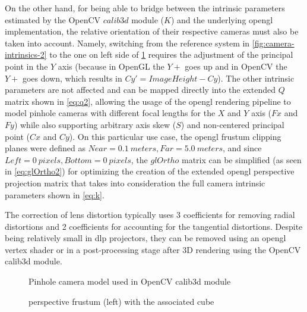 On the other hand, for being able to bridge between the intrinsic parameters estimated by the OpenCV $calib3d$ module ($K$) and the underlying \gls{opengl} implementation, the relative orientation of their respective cameras must also be taken into account. Namely, switching from the reference system in \cref{fig:camera-intrinsics-2} to the one on left side of \cref{fig:gl-projection-matrix} requires the adjustment of the principal point in the $Y$ axis (because in OpenGL the $Y+$ goes up and in OpenCV the $Y+$ goes down, which results in $Cy'=ImageHeight-Cy$). The other intrinsic parameters are not affected and can be mapped directly into the extended $Q$ matrix shown in \cref{eq:q2}, allowing the usage of the \gls{opengl} rendering pipeline to model pinhole cameras with different focal lengths for the $X$ and $Y$ axis ($Fx$ and $Fy$) while also supporting arbitrary axis skew ($S$) and non-centered principal point ($Cx$ and $Cy$). On this particular use case, the \gls{opengl} frustum clipping planes were defined as $Near=0.1\ meters, Far=5.0\ meters$, and since $Left=0\ pixels, Bottom=0\ pixels$, the $glOrtho$ matrix can be simplified (as seen in \cref{eq:glOrtho2}) for optimizing the creation of the extended \gls{opengl} perspective projection matrix that takes into consideration the full camera intrinsic parameters shown in \cref{eq:k}.

The correction of lens distortion typically uses 3 coefficients for removing radial distortions and 2 coefficients for accounting for the tangential distortions. Despite being relatively small in \gls{dlp} projectors, they can be removed using an \gls{opengl} vertex shader or in a post-processing stage after 3D rendering using the OpenCV calib3d module.

\begin{figure}[H]
	\begin{floatrow}[2]
		{\caption[Pinhole camera model used in the OpenCV calib3d module]{Pinhole camera model used in OpenCV calib3d module\footnotemark}\label{fig:camera-intrinsics-2}\vspace{-0.5em}}
		\hspace{0.03em}
		{\caption[{ perspective frustum (left) with the associated  cube}]{{ perspective frustum (left) with the associated  cube}\protect\footnotemark}\label{fig:gl-projection-matrix}\vspace{-0.5em}}
	\end{floatrow}
\end{figure}


